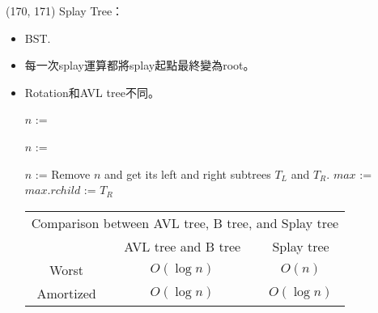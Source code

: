 \item \begin{theorem}{(170, 171)} Splay Tree： \label{splaytree}\begin{itemize}
        \item BST.
        \item 每一次splay運算都將splay起點最終變為root。
        \item Rotation和AVL tree不同。
        \begin{algorithm}[H]
            \begin{algorithmic}[1]
                    \State $n$ := 
                    \State {}
                \EndFunction
            \end{algorithmic}
        \end{algorithm}
        \begin{algorithm}[H]
            \begin{algorithmic}[1]
                    \State $n$ := 
                    \State {}
                \EndFunction
            \end{algorithmic}
        \end{algorithm}
        \begin{algorithm}[H]
            \begin{algorithmic}[1]
                    \State $n$ := 
                    \State {}
                    \State Remove $n$ and get its left and right subtrees $T_L$ and $T_R$.
                    \State $max$ := 
                    \State {}
                    \State $max.rchild$ := $T_R$
                \EndFunction
            \end{algorithmic}
        \end{algorithm}
        \begin{table}[H]
            \centering
            \begin{tabular}{|c|c|c|}
                \hline
                \multicolumn{3}{|c|}{Comparison between AVL tree, B tree, and Splay tree} \\
                \Xhline{3\arrayrulewidth}
                & AVL tree and B tree & Splay tree \\
                \Xhline{2\arrayrulewidth}
                Worst & $O(\log n)$ & $O(n)$ \\
                \hline
                Amortized & $O(\log n)$ & $O(\log n)$ \\
                \hline
            \end{tabular}
        \end{table}
    \end{itemize}
\end{theorem}

